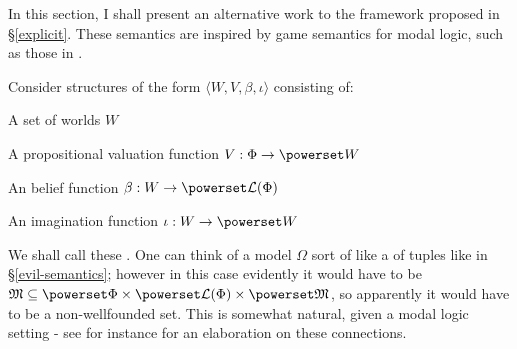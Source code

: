 
In this section, I shall present an alternative work to the framework proposed in \S\ref{explicit}.%
These semantics are inspired by game semantics for modal logic, such as those in \citet[chapter 2]{van_benthem_modal_2010}.

Consider structures of the form $\langle W, V, \beta, \iota \rangle$
consisting of:
\begin{itemizedot}
  \item A set of worlds $W$
  
  \item A propositional valuation function $V : \Phi \rightarrow \powerset
  W$
  
  \item An belief function $\beta : W \rightarrow \powerset \mathcal{L}
  (\Phi)$
  
  \item An imagination function $\iota : W \rightarrow \powerset W$
\end{itemizedot}
We shall call these .   One can think of a
model $\Omega$ sort of like a of tuples like in \S\ref{evil-semantics}; however
in this case evidently it would have to be \ $\Omega \subseteq \powerset
\Phi \times \powerset \mathcal{L} (\Phi) \times \powerset \Omega$, so
apparently it would have to be a non-wellfounded set.   This is somewhat natural,
given a modal logic setting - see for instance \citet{barwise_vicious_1996} for an
elaboration on these connections.

